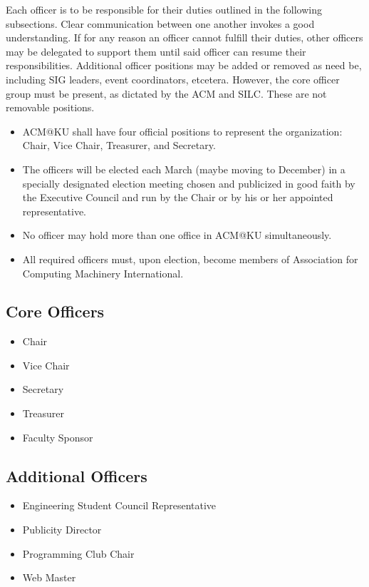 Each officer is to be responsible for their duties outlined in the following
subsections. Clear communication between one another invokes a good understanding.
If for any reason an officer cannot fulfill their duties, other officers may be
delegated to support them until said officer can resume their responsibilities.
Additional officer positions may be added or removed as need be, including SIG
leaders, event coordinators, etcetera. However, the core officer group must be
present, as dictated by the ACM and SILC. These are not removable positions.\
\begin{itemize}
	\item ACM@KU shall have four official positions to represent the organization:
				Chair, Vice Chair, Treasurer, and Secretary.
	\item The officers will be elected each March (maybe moving to December) in a
				specially designated election meeting chosen and publicized in good faith
				by the Executive Council and run by the Chair or by his or her appointed
				representative.
	\item No officer may hold more than one office in ACM@KU simultaneously.
	\item All required officers must, upon election, become members of Association
				for Computing Machinery International.
\end{itemize}

\subsection{Core Officers}
\label{subsec:subsec01}

\begin{itemize}
	\item Chair
   \item Vice Chair
   \item Secretary
   \item Treasurer
   \item Faculty Sponsor
\end{itemize}

\subsection{Additional Officers}
\label{subsec:subsec02}

\begin{itemize}
	\item Engineering Student Council Representative
   \item Publicity Director
   \item Programming Club Chair
   \item Web Master
\end{itemize}

